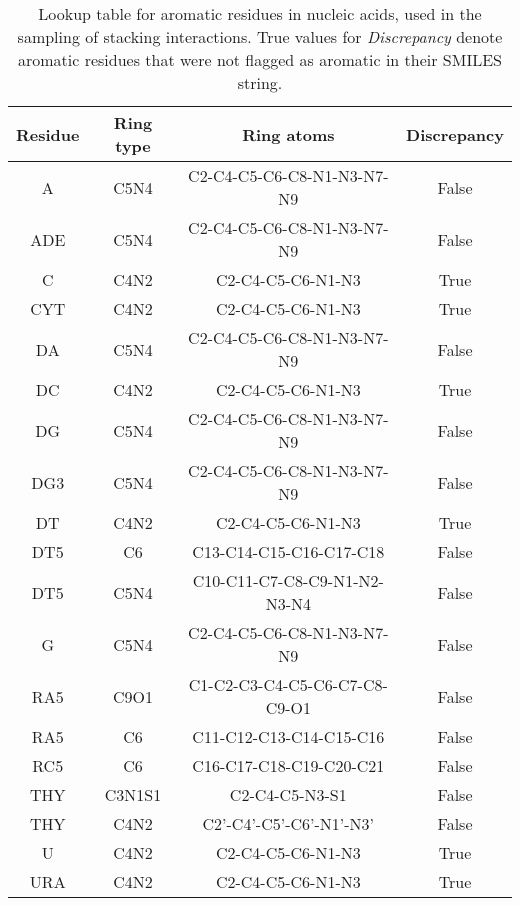 \begin{table}[H]
  \caption{\label{tab:appx1/aromatic_nucleic} Lookup table for aromatic residues in nucleic acids, used in the sampling of stacking interactions. True values for \textit{Discrepancy} denote aromatic residues that were not flagged as aromatic in their SMILES string.}
  \centering
  \begin{tabular}{cccc}
    \hline
    Residue & Ring type  & Ring atoms                    & Discrepancy \\ \hline
    A       & C5N4       & C2-C4-C5-C6-C8-N1-N3-N7-N9    & False       \\
    ADE     & C5N4       & C2-C4-C5-C6-C8-N1-N3-N7-N9    & False       \\
    C       & C4N2       & C2-C4-C5-C6-N1-N3             & True        \\
    CYT     & C4N2       & C2-C4-C5-C6-N1-N3             & True        \\
    DA      & C5N4       & C2-C4-C5-C6-C8-N1-N3-N7-N9    & False       \\
    DC      & C4N2       & C2-C4-C5-C6-N1-N3             & True        \\
    DG      & C5N4       & C2-C4-C5-C6-C8-N1-N3-N7-N9    & False       \\
    DG3     & C5N4       & C2-C4-C5-C6-C8-N1-N3-N7-N9    & False       \\
    DT      & C4N2       & C2-C4-C5-C6-N1-N3             & True        \\
    DT5     & C6         & C13-C14-C15-C16-C17-C18       & False       \\
    DT5     & C5N4       & C10-C11-C7-C8-C9-N1-N2-N3-N4  & False       \\
    G       & C5N4       & C2-C4-C5-C6-C8-N1-N3-N7-N9    & False       \\
    RA5     & C9O1       & C1-C2-C3-C4-C5-C6-C7-C8-C9-O1 & False       \\
    RA5     & C6         & C11-C12-C13-C14-C15-C16       & False       \\
    RC5     & C6         & C16-C17-C18-C19-C20-C21       & False       \\
    THY     & C3N1S1     & C2-C4-C5-N3-S1                & False       \\
    THY     & C4N2       & C2'-C4'-C5'-C6'-N1'-N3'       & False       \\
    U       & C4N2       & C2-C4-C5-C6-N1-N3             & True        \\
    URA     & C4N2       & C2-C4-C5-C6-N1-N3             & True        \\ \hline
  \end{tabular}
\end{table}

